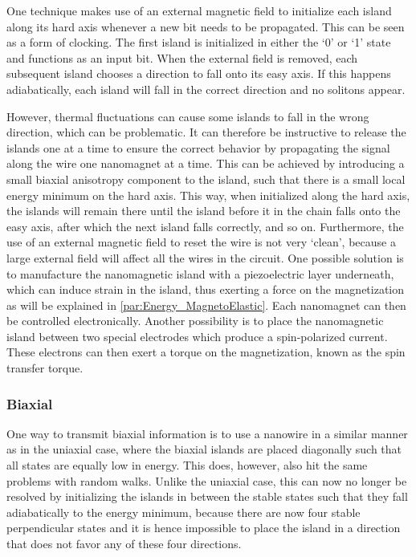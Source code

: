 \documentclass[11pt,a4paper,english]{article}
\begin{document}
One technique makes use of an external magnetic field to initialize each island along its hard axis whenever a new bit needs to be propagated. This can be seen as a form of clocking. The first island is initialized in either the `0' or `1' state and functions as an input bit. %
When the external field is removed, each subsequent island chooses a direction to fall onto its easy axis. If this happens adiabatically, each island will fall in the correct direction and no solitons appear.~\cite{NML_Carlton} \par
However, thermal fluctuations can cause some islands to fall in the wrong direction, which can be problematic. It can therefore be instructive to release the islands one at a time to ensure the correct behavior by propagating the signal along the wire one nanomagnet at a time. This can be achieved by introducing a small biaxial anisotropy component to the island, such that there is a small local energy minimum on the hard axis. This way, when initialized along the hard axis, the islands will remain there until the island before it in the chain falls onto the easy axis, after which the next island falls correctly, and so on. Furthermore, the use of an external magnetic field to reset the wire is not very `clean', because a large external field will affect all the wires in the circuit. One possible solution is to manufacture the nanomagnetic island with a piezoelectric layer underneath, which can induce strain in the island, thus exerting a force on the magnetization as will be explained in \cref{par:Energy_MagnetoElastic}. Each nanomagnet can then be controlled electronically. Another possibility is to place the nanomagnetic island between two special electrodes which produce a spin-polarized current. These electrons can then exert a torque on the magnetization, known as the spin transfer torque.~\cite{SwitchingForced_EnergyEfficient,syllabus_PoAEaPD}

\subsubsection{Biaxial}
One way to transmit biaxial information is to use a nanowire in a similar manner as in the uniaxial case, where the biaxial islands are placed diagonally such that all states are equally low in energy. %
This does, however, also hit the same problems with random walks. Unlike the uniaxial case, this can now no longer be resolved by initializing the islands in between the stable states such that they fall adiabatically to the energy minimum, because there are now four stable perpendicular states and it is hence impossible to place the island in a direction that does not favor any of these four directions.
\end{document}
